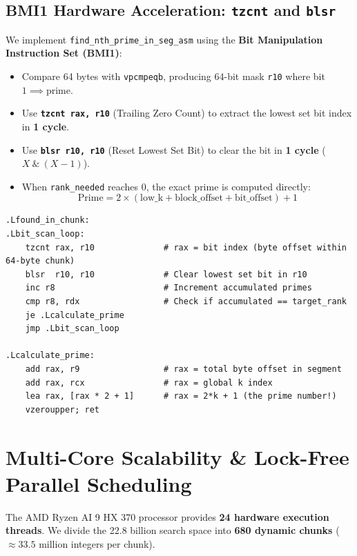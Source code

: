 \documentclass[11pt,a4paper]{article}
\begin{document}
\subsection{BMI1 Hardware Acceleration: \texttt{tzcnt} and \texttt{blsr}}
We implement \texttt{find\_nth\_prime\_in\_seg\_asm} using the \textbf{Bit Manipulation Instruction Set (BMI1)}:
\begin{itemize}\setlength{\itemsep}{0pt}
    \item Compare 64 bytes with \texttt{vpcmpeqb}, producing 64-bit mask \texttt{r10} where bit $1 \implies \text{prime}$.
    \item Use \textbf{\texttt{tzcnt rax, r10}} (Trailing Zero Count) to extract the lowest set bit index in \textbf{1 cycle}.
    \item Use \textbf{\texttt{blsr r10, r10}} (Reset Lowest Set Bit) to clear the bit in \textbf{1 cycle} ($X \ \& \ (X-1)$).
    \item When \texttt{rank\_needed} reaches 0, the exact prime is computed directly:
    \begin{equation}
        \text{Prime} = 2 \times (\text{low\_k} + \text{block\_offset} + \text{bit\_offset}) + 1
    \end{equation}
\end{itemize}

\begin{lstlisting}[language={[x86masm]Assembler}, caption={BMI1 Bit Pinpointing Loop in sieve\_kernel.s}]
.Lfound_in_chunk:
.Lbit_scan_loop:
    tzcnt rax, r10              # rax = bit index (byte offset within 64-byte chunk)
    blsr  r10, r10              # Clear lowest set bit in r10
    inc r8                      # Increment accumulated primes
    cmp r8, rdx                 # Check if accumulated == target_rank
    je .Lcalculate_prime
    jmp .Lbit_scan_loop

.Lcalculate_prime:
    add rax, r9                 # rax = total byte offset in segment
    add rax, rcx                # rax = global k index
    lea rax, [rax * 2 + 1]      # rax = 2*k + 1 (the prime number!)
    vzeroupper; ret
\end{lstlisting}

\section{Multi-Core Scalability \& Lock-Free Parallel Scheduling}

The AMD Ryzen AI 9 HX 370 processor provides \textbf{24 hardware execution threads}. We divide the 22.8 billion search space into \textbf{680 dynamic chunks} ($\approx 33.5$ million integers per chunk).
\end{document}
